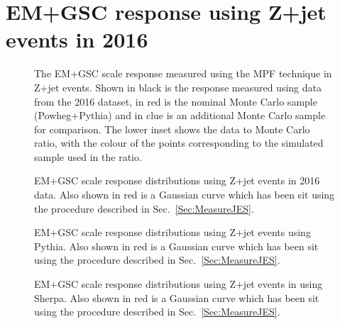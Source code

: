 \chapter{EM+GSC response using Z+jet events in 2016}
\label{App:ZJetEM2016}

\begin{figure}[!ht]
  \begin{center}
  \end{center}
  \caption[EM scale response using Z+jet in 2016]
  {\small The EM+GSC scale response measured using the MPF technique in Z+jet events.  Shown in black is the response measured using data from the 2016 dataset, in red is the nominal Monte Carlo sample (Powheg+Pythia) and in clue is an additional Monte Carlo sample for comparison.  The lower inset shows the data to Monte Carlo ratio, with the colour of the points corresponding to the simulated sample used in the ratio.  }
  \label{plot:ZJetEM2016App}
\end{figure}


\begin{figure}[!ht]
  \begin{center}
  \end{center}
  \caption[EM scale response distributions in data using Z+jet in 2016]
  {\small EM+GSC scale response distributions using Z+jet events in 2016 data.  Also shown in red is a Gaussian curve which has been sit using the procedure described in Sec.~\ref{Sec:MeasureJES}. }
  \label{plot:ZJetEM2016DataDistsApp}
\end{figure}

\begin{figure}[!ht]
  \begin{center}
  \end{center}
  \caption[EM scale response distributions in Pythia using Z+jet in 2016]
  {\small EM+GSC scale response distributions using Z+jet events using Pythia.  Also shown in red is a Gaussian curve which has been sit using the procedure described in Sec.~\ref{Sec:MeasureJES}. }
  \label{plot:ZJetEM2016PythiaistsApp}
\end{figure}

\begin{figure}[!ht]
  \begin{center}
  \end{center}
  \caption[EM scale response distributions in Sherpa using Z+jet in 2016]
  {\small EM+GSC scale response distributions using Z+jet events in using Sherpa.  Also shown in red is a Gaussian curve which has been sit using the procedure described in Sec.~\ref{Sec:MeasureJES}. }
  \label{plot:ZJetEM2016SherpaDistsApp}
\end{figure}

